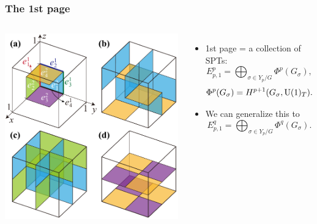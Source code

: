 \documentclass[xcolor=table, aspectratio=43,ignorenonframetext]{beamer}
\newcommand{\uone}{\text U(1)}
\begin{document}
\begin{frame}
	\frametitle{The 1st page}

	\begin{columns}
		\begin{center}
			\includegraphics[width=\textwidth]{../spspt/blocks}
		\end{center}
		\begin{itemize}
			\item 1st page = a collection of SPTs:
			\[E^p_{p,1} = \bigoplus_{\sigma\in Y_p/G} \Phi^p(G_\sigma),\]
			\[\Phi^p(G_\sigma) = H^{p+1}(G_\sigma, \uone_T).\]
			\item We can generalize this to
			\[E^q_{p,1} = \bigoplus_{\sigma\in Y_p/G} \Phi^q(G_\sigma).\]
		\end{itemize}
	\end{columns}
\end{frame}
\end{document}
